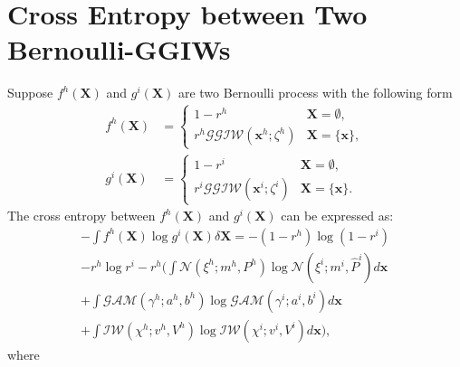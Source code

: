 \documentclass[journal]{IEEEtran}
\begin{document}
\section{Cross Entropy between Two Bernoulli-GGIWs}
\label{appendix:crossentropy}
Suppose $f^h(\mathbf{X})$ and $g^i(\mathbf{X})$ are two Bernoulli process with the following form
\begin{subequations}
\begin{align}
    f^{h}(\mathbf{X}) &= \begin{cases}
        1 - r^{h} & \mathbf{X} = \emptyset,\\
        r^{h}\mathcal{GGIW}(\mathbf{x}^{h};\zeta^{h}) & \mathbf{X} = \{\mathbf{x}\},
    \end{cases}\\
    g^{i}(\mathbf{X}) &= \begin{cases}
        1 - r^{i} & \mathbf{X} = \emptyset,\\
        r^{i}\mathcal{GGIW}(\mathbf{x}^{i};\zeta^{i}) & \mathbf{X} = \{\mathbf{x}\}.
    \end{cases}
\end{align}
\end{subequations}
The cross entropy between $f^h(\mathbf{X})$ and $g^i(\mathbf{X})$ can be expressed as:
\begin{multline}
    -\int f^{h}(\mathbf{X})\log g^{i}(\mathbf{X})\delta\mathbf{X} = -(1-r^{h})\log(1-r^i) \\- r^{h}\log r^i - r^{h}\bigg(\int\mathcal{N}(\xi^{h};m^{h},P^{h})\log\mathcal{N}(\xi^i;m^i,\hat{P}^i)d\mathbf{x} \\+ \int\mathcal{GAM}(\gamma^{h};a^{h},b^{h})\log\mathcal{GAM}(\gamma^i;a^i,b^i)d\mathbf{x} \\+ \int\mathcal{IW}(\chi^{h};v^{h},V^{h})\log\mathcal{IW}(\chi^i;v^i,V^i)d\mathbf{x} \bigg),
\end{multline}
where
\end{document}
